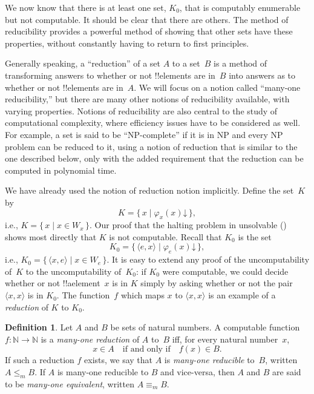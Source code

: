 \documentclass[10pt,a4paper]{article}
\makeatletter
\theoremstyle{plain}
\theoremstyle{definition}
\newtheorem{defn}[thm]{Definition}
\theoremstyle{remark}
\newenvironment{explain}{}{}
\newcommand{\olref}{\@ifnextchar[{\olref@i}{\olref@final}}
\def\olref@i[#1]{\@ifnextchar[{\olref@ii}{\olref@final}}
\def\olref@ii[#1]{\@ifnextchar[{\olref@iii}{\olref@final}}
\def\olref@iii[#1]{\olref@final}
\def\olref@final#1{\ref{#1}}
\providecommand{\tuple}[1]{\langle #1 \rangle}
\providecommand{\cfind}[1]{\varphi_{#1}}
\providecommand{\Nat}{\ensuremath{\mathbb{N}}}
\providecommand{\fdefined}{\mathord{\downarrow}}
\providecommand{\Setabs}[2]{\{\, #1 \mid #2 \,\}}
\makeatother
\begin{document}
\begin{explain}
We now know that there is at least one set, $K_0$, that is computably
enumerable but not computable. It should be clear that there are
others. The method of reducibility provides a powerful method of
showing that other sets have these properties, without constantly
having to return to first principles.

Generally speaking, a ``reduction'' of a set $A$ to a set~$B$ is a
method of transforming answers to whether or not !!{element}s are in~$B$
into answers as to whether or not !!{element}s are in~$A$. We will focus
on a notion called ``many-one reducibility,'' but there are many other
notions of reducibility available, with varying properties. Notions of
reducibility are also central to the study of computational
complexity, where efficiency issues have to be considered as well. For
example, a set is said to be ``NP-complete'' if it is in NP and every
NP problem can be reduced to it, using a notion of reduction that is
similar to the one described below, only with the added requirement
that the reduction can be computed in polynomial time.

We have already used the notion of reduction notion implicitly. Define
the set~$K$ by
\[
K = \Setabs{x}{\cfind{x}(x) \fdefined},
\]
i.e., $K = \Setabs{x}{x \in W_x}$. Our proof that the halting problem
in unsolvable (\olref[hlt]{thm:halting-problem}) shows most directly
that $K$ is not computable. Recall that $K_0$ is the set
\[
K_0 = \Setabs{\tuple{e, x}}{\cfind{e}(x) \fdefined },
\]
i.e., $K_0 = \Setabs{\tuple{x,e}}{x \in W_e}$. It is easy to extend
any proof of the uncomputability of~$K$ to the uncomputability
of~$K_0$: if $K_0$ were computable, we could decide whether or not
!!a{element}~$x$ is in $K$ simply by asking whether or not the pair
$\tuple{x, x}$ is in $K_0$. The function~$f$ which maps $x$ to
$\tuple{x, x}$ is an example of a \emph{reduction} of $K$ to $K_0$.
\end{explain}

\begin{defn}
Let $A$ and $B$ be sets of natural numbers. A computable
function~$f\colon \Nat \to \Nat$ is a \emph{many-one reduction} of $A$
to~$B$ iff, for every natural number~$x$,
\[
x \in A \quad \text{if and only if} \quad f(x) \in B.
\]
If such a reduction $f$ exists, we say that $A$ is \emph{many-one
reducible} to~$B$, written $A \leq_m B$. If $A$ is many-one reducible
to $B$ and vice-versa, then $A$ and $B$ are said to be \emph{many-one
equivalent}, written $A \equiv_m B$.
\end{defn}
\end{document}
